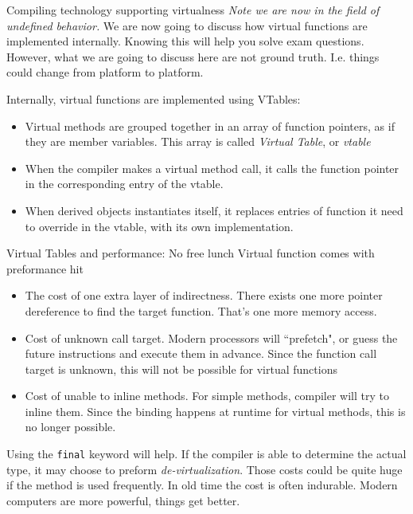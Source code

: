 \begin{frame}{Compiling technology supporting virtualness}
\textit{Note we are now in the field of undefined behavior.} We are now going to discuss how virtual functions are implemented internally. Knowing this will help you solve exam questions. However, what we are going to discuss here are not ground truth. I.e. things could change from platform to platform. 

Internally, virtual functions are implemented using VTables:

\begin{itemize}
	\item Virtual methods are grouped together in an array of function pointers, as if they are member variables. This array is called \textit{Virtual Table}, or \textit{vtable} 
	\item When the compiler makes a virtual method call, it calls the function pointer in the corresponding entry of the vtable. 
	\item When derived objects instantiates itself, it replaces entries of function it need to override in the vtable, with its own implementation.
\end{itemize}
\end{frame}

\begin{frame}{Virtual Tables and performance: No free lunch}
\vspace{-0.1in}
Virtual function comes with preformance hit
\begin{itemize}
	\item The cost of one extra layer of indirectness. There exists one more pointer dereference to find the target function. That's one more memory access. 
	\item Cost of unknown call target. Modern processors will ``prefetch", or guess the future instructions and execute them in advance. Since the function call target is unknown, this will not be possible for virtual functions
	\item Cost of unable to inline methods. For simple methods, compiler will try to inline them. Since the binding happens at runtime for virtual methods, this is no longer possible.
\end{itemize}
Using the \texttt{final} keyword will help. If the compiler is able to determine the actual type, it may choose to preform \textit{de-virtualization}. Those costs could be quite huge if the method is used frequently. In old time the cost is often indurable. Modern computers are more powerful, things get better.
\end{frame}


